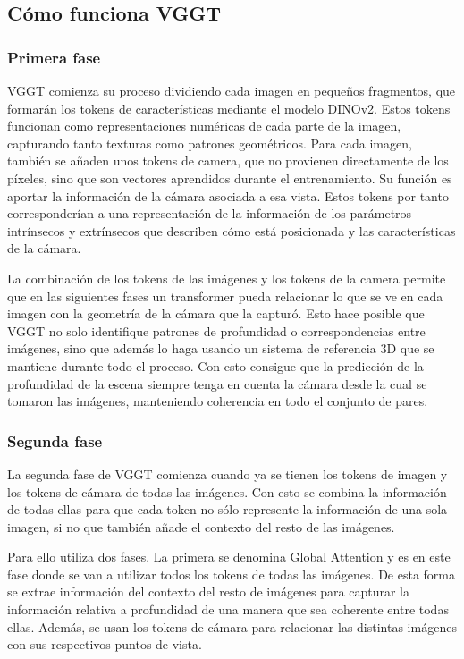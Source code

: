 
\subsection{Cómo funciona VGGT}
\subsubsection{Primera fase}
VGGT comienza su proceso dividiendo cada imagen en pequeños fragmentos, que formarán los tokens de características mediante el modelo DINOv2. Estos tokens funcionan como representaciones numéricas de cada parte de la imagen, capturando tanto texturas como patrones geométricos. Para cada imagen, también se añaden unos tokens de camera, que no provienen directamente de los píxeles, sino que son vectores aprendidos durante el entrenamiento. Su función es aportar la información de la cámara asociada a esa vista. Estos tokens por tanto corresponderían a una representación de la información de los parámetros intrínsecos y extrínsecos que describen cómo está posicionada y las características de la cámara.

La combinación de los tokens de las imágenes y los tokens de la camera permite que en las siguientes fases un transformer pueda relacionar lo que se ve en cada imagen con la geometría de la cámara que la capturó. Esto hace posible que VGGT no solo identifique patrones de profundidad o correspondencias entre imágenes, sino que además lo haga usando un sistema de referencia 3D que se mantiene durante todo el proceso. Con esto consigue que la predicción de la profundidad de la escena siempre tenga en cuenta la cámara desde la cual se tomaron las imágenes, manteniendo coherencia en todo el conjunto de pares.

\subsubsection{Segunda fase}
La segunda fase de VGGT comienza cuando ya se tienen los tokens de imagen y los tokens de cámara de todas las imágenes. Con esto se combina la información de todas ellas para que cada token no sólo represente la información de una sola imagen, si no que también añade el contexto del resto de las imágenes.

Para ello utiliza dos fases. La primera se denomina Global Attention y es en este fase donde se van a utilizar todos los tokens de todas las imágenes. De esta forma se extrae información del contexto del resto de imágenes para capturar la información relativa a profundidad de una manera que sea coherente entre todas ellas. Además, se usan los tokens de cámara para relacionar las distintas imágenes con sus respectivos puntos de vista.

